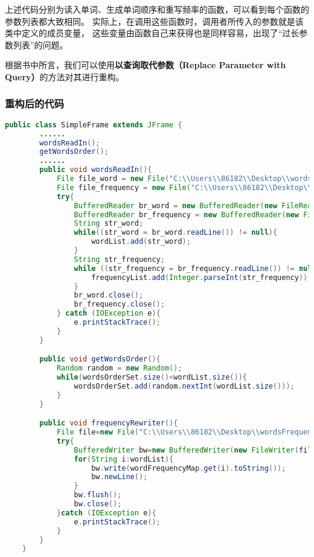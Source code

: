 \documentclass[a4paper]{article}
\begin{document}
上述代码分别为读入单词、生成单词顺序和重写频率的函数，可以看到每个函数的参数列表都大致相同。
实际上，在调用这些函数时，调用者所传入的参数就是该类中定义的成员变量，
这些变量由函数自己来获得也是同样容易，出现了“过长参数列表”的问题。

根据书中所言，我们可以使用\textbf{以查询取代参数（Replace Parameter with Query）}的方法对其进行重构。
\subsubsection*{重构后的代码}
\begin{lstlisting}[language={java}]
    public class SimpleFrame extends JFrame {
        ......
        wordsReadIn();
        getWordsOrder();
        ......
        public void wordsReadIn(){
            File file_word = new File("C:\\Users\\86182\\Desktop\\wordsreview.txt");
            File file_frequency = new File("C:\\Users\\86182\\Desktop\\wordsFrequency.txt");
            try{
                BufferedReader br_word = new BufferedReader(new FileReader(file_word));
                BufferedReader br_frequency = new BufferedReader(new FileReader(file_frequency));
                String str_word;
                while((str_word = br_word.readLine()) != null){
                    wordList.add(str_word);
                }
                String str_frequency;
                while ((str_frequency = br_frequency.readLine()) != null && !str_frequency.equals("")){
                    frequencyList.add(Integer.parseInt(str_frequency));
                }
                br_word.close();
                br_frequency.close();
            } catch (IOException e){
                e.printStackTrace();
            }
        }

        public void getWordsOrder(){
            Random random = new Random();
            while(wordsOrderSet.size()<wordList.size()){
                wordsOrderSet.add(random.nextInt(wordList.size()));
            }
        }

        public void frequencyRewriter(){
            File file=new File("C:\\Users\\86182\\Desktop\\wordsFrequency.txt");
            try{
                BufferedWriter bw=new BufferedWriter(new FileWriter(file));
                for(String i:wordList){
                    bw.write(wordFrequencyMap.get(i).toString());
                    bw.newLine();
                }
                bw.flush();
                bw.close();
            }catch (IOException e){
                e.printStackTrace();
            }
        }
    }
\end{lstlisting}
\end{document}
